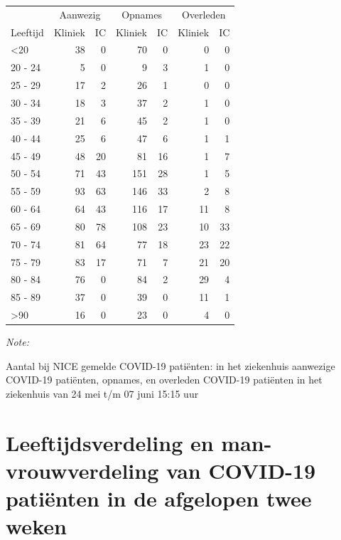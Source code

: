 \documentclass[
  english,
  man,floatsintext]{apa6}
\begin{document}
\begin{table}
\centering\begingroup\fontsize{10}{12}\selectfont

\begin{threeparttable}
\begin{tabular}{lrrrrrr}
\toprule
\multicolumn{1}{c}{ } & \multicolumn{2}{c}{Aanwezig} & \multicolumn{2}{c}{Opnames} & \multicolumn{2}{c}{Overleden} \\
\cmidrule(l{3pt}r{3pt}){2-3} \cmidrule(l{3pt}r{3pt}){4-5} \cmidrule(l{3pt}r{3pt}){6-7}
Leeftijd & Kliniek & IC & Kliniek & IC & Kliniek & IC\\
\midrule
<20 & 38 & 0 & 70 & 0 & 0 & 0\\
20 - 24 & 5 & 0 & 9 & 3 & 1 & 0\\
25 - 29 & 17 & 2 & 26 & 1 & 0 & 0\\
30 - 34 & 18 & 3 & 37 & 2 & 1 & 0\\
35 - 39 & 21 & 6 & 45 & 2 & 1 & 0\\
40 - 44 & 25 & 6 & 47 & 6 & 1 & 1\\
45 - 49 & 48 & 20 & 81 & 16 & 1 & 7\\
50 - 54 & 71 & 43 & 151 & 28 & 1 & 5\\
55 - 59 & 93 & 63 & 146 & 33 & 2 & 8\\
60 - 64 & 64 & 43 & 116 & 17 & 11 & 8\\
65 - 69 & 80 & 78 & 108 & 23 & 10 & 33\\
70 - 74 & 81 & 64 & 77 & 18 & 23 & 22\\
75 - 79 & 83 & 17 & 71 & 7 & 21 & 20\\
80 - 84 & 76 & 0 & 84 & 2 & 29 & 4\\
85 - 89 & 37 & 0 & 39 & 0 & 11 & 1\\
>90 & 16 & 0 & 23 & 0 & 4 & 0\\
\bottomrule
\end{tabular}
\begin{tablenotes}
\item \textit{Note: } 
\item Aantal bij NICE gemelde COVID-19 patiënten: in het ziekenhuis aanwezige COVID-19 patiënten, opnames, en overleden COVID-19 patiënten in het ziekenhuis van 24 mei t/m 07 juni 15:15 uur
\end{tablenotes}
\end{threeparttable}
\endgroup{}
\end{table}

\newpage

\hypertarget{leeftijdsverdeling-en-man-vrouwverdeling-van-covid-19-patiuxebnten-in-de-afgelopen-twee-weken}{%
\section{Leeftijdsverdeling en man-vrouwverdeling van COVID-19 patiënten in de afgelopen twee weken}\label{leeftijdsverdeling-en-man-vrouwverdeling-van-covid-19-patiuxebnten-in-de-afgelopen-twee-weken}}
\end{document}

